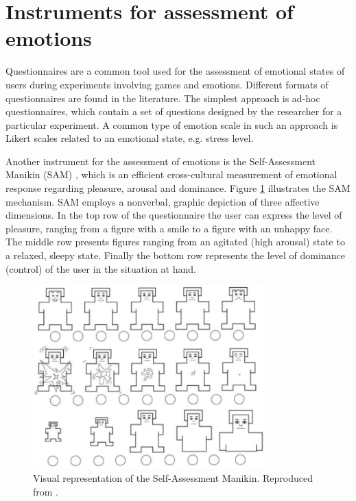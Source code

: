 
\section{Instruments for assessment of emotions}

Questionnaires are a common tool used for the assessment of emotional states of users during experiments involving games and emotions. Different formats of questionnaires are found in the literature. The simplest approach is ad-hoc questionnaires, which contain a set of questions designed by the researcher for a particular experiment. A common type of emotion scale in such an approach is Likert scales related to an emotional state, e.g. stress level.

Another instrument for the assessment of emotions is the Self-Assessment Manikin (SAM) \parencite{morris1995observations}, which is an efficient cross-cultural measurement of emotional response regarding pleasure, arousal and dominance. Figure \ref{fig:sam} illustrates the SAM mechanism. SAM employs a nonverbal, graphic depiction of three affective dimensions. In the top row of the questionnaire the user can express the level of pleasure, ranging from a figure with a smile to a figure with an unhappy face. The middle row presents figures ranging from an agitated (high arousal) state to a relaxed, sleepy state. Finally the bottom row represents the level of dominance (control) of the user in the situation at hand.

\begin{figure}[h]
    \centering
    \includegraphics[width=0.8\textwidth]{Content/figures/SAM.png}
    \caption{Visual representation of the Self-Assessment Manikin. Reproduced from \textcite{morris1995observations}.}
    \label{fig:sam}
\end{figure}

